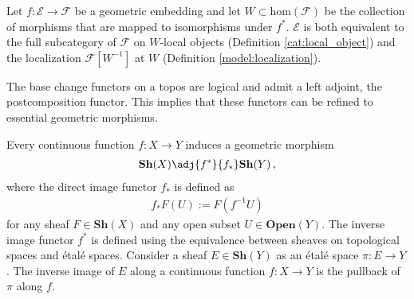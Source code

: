     \begin{property}\label{topos:characterization_embedding}
        Let $f:\mathcal{E}\rightarrow\mathcal{F}$ be a geometric embedding and let $W\subset\mathrm{hom}(\mathcal{F})$ be the collection of morphisms that are mapped to isomorphisms under $f^*$. $\mathcal{E}$ is both equivalent to the full subcategory of $\mathcal{F}$ on $W$-local objects (Definition \ref{cat:local_object}) and the localization $\mathcal{F}[W^{-1}]$ at $W$ (Definition \ref{model:localization}).
    \end{property}

    \begin{property}
        The base change functors on a topos are logical and admit a left adjoint, the postcomposition functor. This implies that these functors can be refined to essential geometric morphisms.
    \end{property}

    \begin{example}\label{topos:topological_spaces}
        Every continuous function $f:X\rightarrow Y$ induces a geometric morphism
        \begin{gather}
            \mathbf{Sh}(X)\adj{f^*}{f_*}\mathbf{Sh}(Y)\,,
        \end{gather}
        where the direct image functor $f_*$ is defined as
        \begin{gather}
            f_*F(U) := F(f^{-1}U)
        \end{gather}
        for any sheaf $F\in\mathbf{Sh}(X)$ and any open subset $U\in\mathbf{Open}(Y)$. The inverse image functor $f^*$ is defined using the equivalence between sheaves on topological spaces and \'etal\'e spaces. Consider a sheaf $E\in\mathbf{Sh}(Y)$ as an \'etal\'e space $\pi:E\rightarrow Y$. The inverse image of $E$ along a continuous function $f:X\rightarrow Y$ is the pullback of $\pi$ along $f$.
    \end{example}

